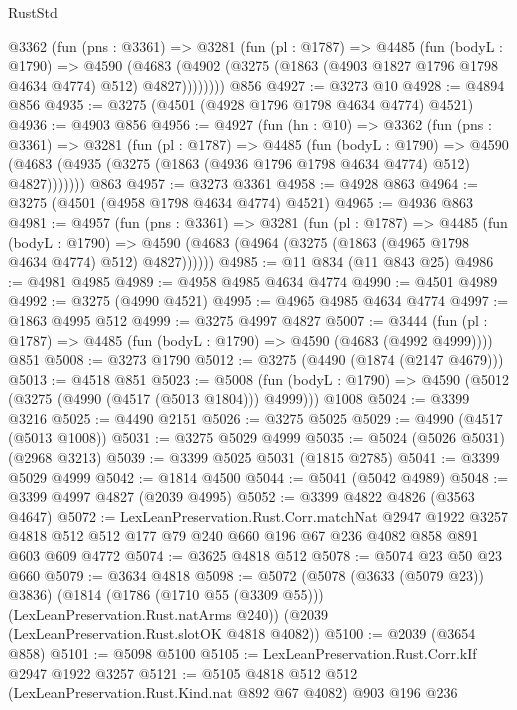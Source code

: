 \begin{lexlean}{RustStd}
\begin{coremodule}
      @3362
        (fun (pns : @3361) =>
        @3281
          (fun (pl : @1787) =>
          @4485
            (fun (bodyL : @1790) =>
            @4590
              (@4683 (@4902 (@3275 (@1863 (@4903 @1827 @1796 @1798 @4634 @4774) @512) @4827))))))))
    @856
@4927 := @3273 @10
@4928 := @4894 @856
@4935 := @3275 (@4501 (@4928 @1796 @1798 @4634 @4774) @4521)
@4936 := @4903 @856
@4956 := @4927
    (fun (hn : @10) =>
    @3362
      (fun (pns : @3361) =>
      @3281
        (fun (pl : @1787) =>
        @4485
          (fun (bodyL : @1790) =>
          @4590 (@4683 (@4935 (@3275 (@1863 (@4936 @1796 @1798 @4634 @4774) @512) @4827)))))))
    @863
@4957 := @3273 @3361
@4958 := @4928 @863
@4964 := @3275 (@4501 (@4958 @1798 @4634 @4774) @4521)
@4965 := @4936 @863
@4981 := @4957
    (fun (pns : @3361) =>
    @3281
      (fun (pl : @1787) =>
      @4485
        (fun (bodyL : @1790) =>
        @4590 (@4683 (@4964 (@3275 (@1863 (@4965 @1798 @4634 @4774) @512) @4827))))))
@4985 := @11 @834 (@11 @843 @25)
@4986 := @4981 @4985
@4989 := @4958 @4985 @4634 @4774
@4990 := @4501 @4989
@4992 := @3275 (@4990 @4521)
@4995 := @4965 @4985 @4634 @4774
@4997 := @1863 @4995 @512
@4999 := @3275 @4997 @4827
@5007 := @3444 (fun (pl : @1787) => @4485 (fun (bodyL : @1790) => @4590 (@4683 (@4992 @4999)))) @851
@5008 := @3273 @1790
@5012 := @3275 (@4490 (@1874 (@2147 @4679)))
@5013 := @4518 @851
@5023 := @5008
    (fun (bodyL : @1790) => @4590 (@5012 (@3275 (@4990 (@4517 (@5013 @1804))) @4999)))
    @1008
@5024 := @3399 @3216
@5025 := @4490 @2151
@5026 := @3275 @5025
@5029 := @4990 (@4517 (@5013 @1008))
@5031 := @3275 @5029 @4999
@5035 := @5024 (@5026 @5031) (@2968 @3213)
@5039 := @3399 @5025 @5031 (@1815 @2785)
@5041 := @3399 @5029 @4999
@5042 := @1814 @4500
@5044 := @5041 (@5042 @4989)
@5048 := @3399 @4997 @4827 (@2039 @4995)
@5052 := @3399 @4822 @4826 (@3563 @4647)
@5072 := LexLeanPreservation.Rust.Corr.matchNat
    @2947
    @1922
    @3257
    @4818
    @512
    @512
    @177
    @79
    @240
    @660
    @196
    @67
    @236
    @4082
    @858
    @891
    @603
    @609
    @4772
@5074 := @3625 @4818 @512
@5078 := @5074 @23 @50 @23 @660
@5079 := @3634 @4818
@5098 := @5072
    (@5078 (@3633 (@5079 @23)) @3836)
    (@1814 (@1786 (@1710 @55 (@3309 @55))) (LexLeanPreservation.Rust.natArms @240))
    (@2039 (LexLeanPreservation.Rust.slotOK @4818 @4082))
@5100 := @2039 (@3654 @858)
@5101 := @5098 @5100
@5105 := LexLeanPreservation.Rust.Corr.kIf @2947 @1922 @3257
@5121 := @5105
    @4818
    @512
    @512
    (LexLeanPreservation.Rust.Kind.nat @892 @67 @4082)
    @903
    @196
    @236

\end{coremodule}
\end{lexlean}
